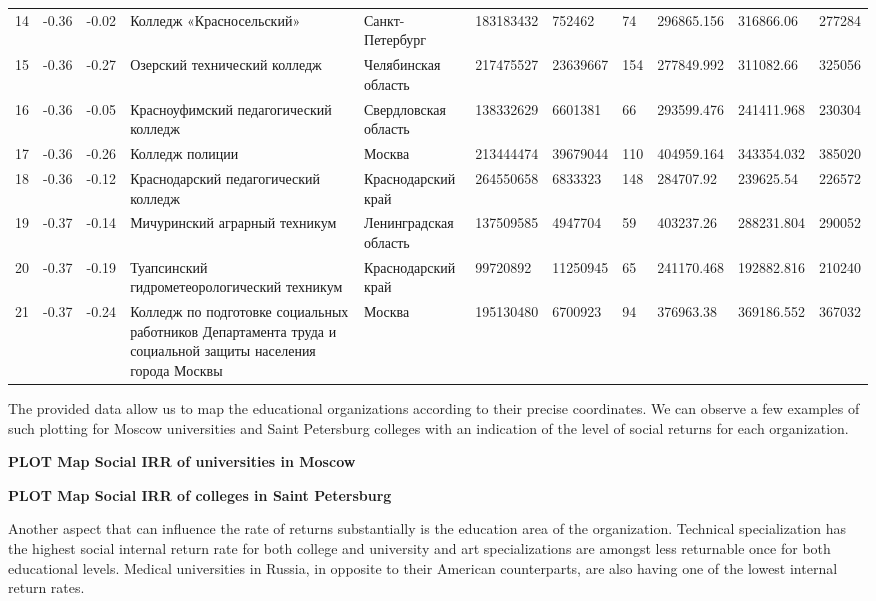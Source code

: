 \documentclass[alpha-refs]{wiley-article-05g}
\begin{document}
\begin{table}[ht]
\begin{tabular}{rllllllllll}
		14 & -0.36 & -0.02 & Колледж «Красносельский» & Санкт-Петербург & 183183432 & 752462 & 74 & 296865.156 & 316866.06 & 277284 \\ 
		15 & -0.36 & -0.27 & Озерский технический колледж & Челябинская область & 217475527 & 23639667 & 154 & 277849.992 & 311082.66 & 325056 \\ 
		16 & -0.36 & -0.05 & Красноуфимский педагогический колледж & Свердловская область & 138332629 & 6601381 & 66 & 293599.476 & 241411.968 & 230304 \\ 
		17 & -0.36 & -0.26 & Колледж полиции & Москва & 213444474 & 39679044 & 110 & 404959.164 & 343354.032 & 385020 \\ 
		18 & -0.36 & -0.12 & Краснодарский педагогический колледж & Краснодарский край & 264550658 & 6833323 & 148 & 284707.92 & 239625.54 & 226572 \\ 
		19 & -0.37 & -0.14 & Мичуринский аграрный техникум & Ленинградская область & 137509585 & 4947704 & 59 & 403237.26 & 288231.804 & 290052 \\ 
		20 & -0.37 & -0.19 & Туапсинский гидрометеорологический техникум & Краснодарский край & 99720892 & 11250945 & 65 & 241170.468 & 192882.816 & 210240 \\ 
		21 & -0.37 & -0.24 & Колледж по подготовке социальных работников Департамента труда и социальной защиты населения города Москвы & Москва & 195130480 & 6700923 & 94 & 376963.38 & 369186.552 & 367032 \\ 
		\hline
	\end{tabular}
\end{table}


The provided data allow us to map the educational organizations according to their precise coordinates. We can observe a few examples of such plotting for Moscow universities and Saint Petersburg colleges with an indication of the level of social returns for each organization.

\textbf{PLOT Map Social IRR of universities in Moscow}

\textbf{PLOT Map Social IRR of colleges in Saint Petersburg}

Another aspect that can influence the rate of returns substantially is the education area of the organization. Technical specialization has the highest social internal return rate for both college and university and art specializations are amongst less returnable once for both educational levels. Medical universities in Russia, in opposite to their American counterparts, are also having one of the lowest internal return rates.
\end{document}
